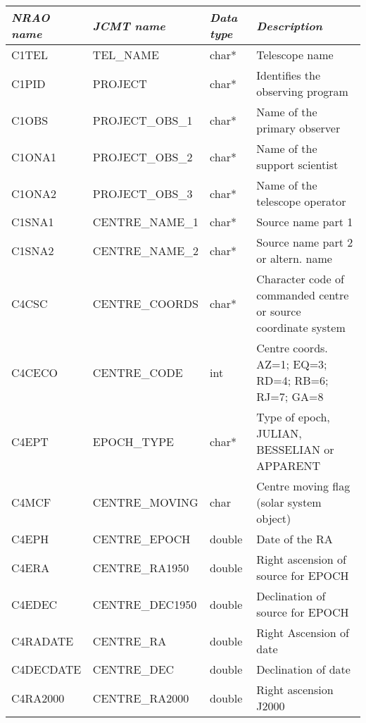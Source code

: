 \documentclass[twoside,11pt,nolof]{starlink}
\begin{document}
\begin {longtable}{|p{38mm}|p{42mm}|p{11mm}|p{55mm}|}

\hline
\textit{NRAO name} & \textit{JCMT name} & \textit{Data type} & \textit{Description}\\

\hline \label{GSDVars:telName}C1TEL & TEL\_NAME & char* & Telescope name\\
\hline \label{GSDVars:project}C1PID & PROJECT & char* & Identifies the observing program\\
\hline \label{GSDVars:projectObs1}C1OBS & PROJECT\_OBS\_1 & char* & Name of the primary observer\\
\hline \label{GSDVars:projectObs2}C1ONA1 & PROJECT\_OBS\_2 & char* & Name of the support scientist\\
\hline \label{GSDVars:projectObs3}C1ONA2 & PROJECT\_OBS\_3 & char* & Name of the telescope operator\\
\hline \label{GSDVars:object1}C1SNA1 & CENTRE\_NAME\_1 & char* & Source name part 1\\
\hline \label{GSDVars:object2}C1SNA2 & CENTRE\_NAME\_2 & char* & Source name part 2 or altern. name\\
\hline \label{GSDVars:centreCoords}C4CSC & CENTRE\_COORDS & char* & Character code of commanded centre or source coordinate system\\
\hline \label{GSDVars:centreCode}C4CECO & CENTRE\_CODE & int & Centre coords. AZ=1; EQ=3; RD=4; RB=6; RJ=7; GA=8\\
\hline \label{GSDVars:epochType}C4EPT & EPOCH\_TYPE & char* & Type of epoch, JULIAN, BESSELIAN or APPARENT\\
\hline \label{GSDVars:centreMoving}C4MCF & CENTRE\_MOVING & char & Centre moving flag (solar system object)\\
\hline \label{GSDVars:centreEpoch}C4EPH & CENTRE\_EPOCH & double & Date of the RA\\
\hline \label{GSDVars:centreRA1950}C4ERA & CENTRE\_RA1950 & double & Right ascension of source for EPOCH\\
\hline \label{GSDVars:centreDec1950}C4EDEC & CENTRE\_DEC1950 & double & Declination of source for EPOCH\\
\hline \label{GSDVars:centreRA}C4RADATE & CENTRE\_RA & double & Right Ascension of date\\
\hline \label{GSDVars:centreDec}C4DECDATE & CENTRE\_DEC & double & Declination of date\\
\hline \label{GSDVars:centreRA2000}C4RA2000 & CENTRE\_RA2000 & double & Right ascension J2000\\

\end{longtable}
\end{document}
